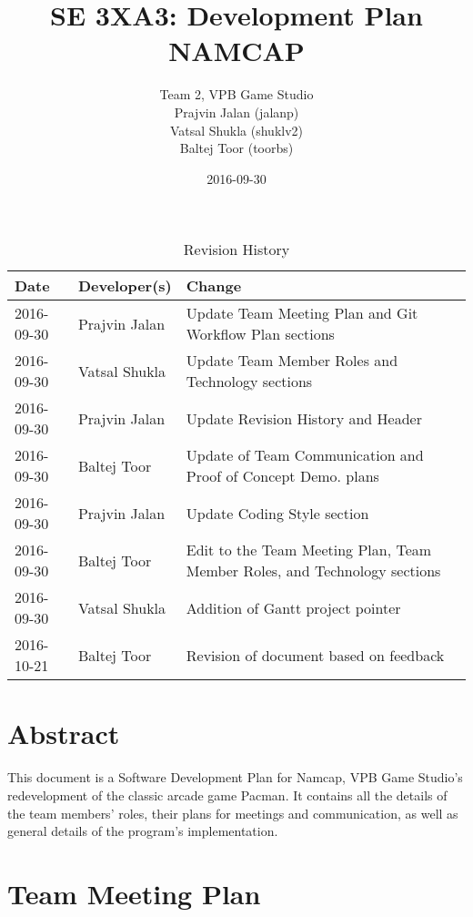 \documentclass{article}
\title{SE 3XA3: Development Plan\\NAMCAP}
\author{Team 2, VPB Game Studio
		\\ Prajvin Jalan (jalanp)
		\\ Vatsal Shukla (shuklv2)
		\\ Baltej Toor (toorbs)
}
\date{2016-09-30}
\begin{document}
\begin{table}[hp]
\caption{Revision History} \label{TblRevisionHistory}
\begin{tabularx}{\textwidth}{llX}
\toprule
\textbf{Date} & \textbf{Developer(s)} & \textbf{Change}\\
\midrule
2016-09-30 & Prajvin Jalan & Update Team Meeting Plan and Git Workflow Plan sections\\
2016-09-30 & Vatsal Shukla & Update Team Member Roles and Technology sections \\
2016-09-30 & Prajvin Jalan & Update Revision History and Header\\
2016-09-30 & Baltej Toor & Update of Team Communication and Proof of Concept Demo. plans\\
2016-09-30 & Prajvin Jalan & Update Coding Style section\\
2016-09-30 & Baltej Toor & Edit to the Team Meeting Plan, Team Member Roles, and Technology sections\\ 
2016-09-30 & Vatsal Shukla & Addition of Gantt project pointer\\
2016-10-21 & Baltej Toor & Revision of document based on feedback\\
\bottomrule
\end{tabularx}
\end{table}

\newpage

\maketitle

\section*{\hfil Abstract \hfil}
This document is a Software Development Plan for Namcap, VPB Game Studio's redevelopment of the classic arcade game Pacman. It contains all the details of the team members' roles, their plans for meetings and communication, as well as general details of the program's implementation.

\section{Team Meeting Plan}

\paragraph{}
\end{document}
